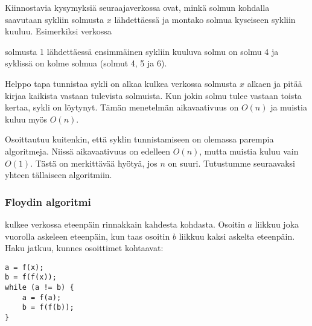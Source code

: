 
Kiinnostavia kysymyksiä seuraajaverkossa ovat,
minkä solmun kohdalla saavutaan sykliin
solmusta $x$ lähdettäessä
ja montako solmua kyseiseen sykliin kuuluu.
Esimerkiksi verkossa

\begin{center}
\end{center}
solmusta 1 lähdettäessä ensimmäinen sykliin kuuluva
solmu on solmu 4 ja syklissä on kolme solmua
(solmut 4, 5 ja 6).

Helppo tapa tunnistaa sykli on alkaa kulkea verkossa
solmusta $x$ alkaen ja pitää kirjaa kaikista vastaan tulevista
solmuista. Kun jokin solmu tulee vastaan toista kertaa,
sykli on löytynyt. Tämän menetelmän aikavaativuus on $O(n)$
ja muistia kuluu myös $O(n)$.

Osoittautuu kuitenkin, että syklin tunnistamiseen on
olemassa parempia algoritmeja.
Niissä aikavaativuus on edelleen $O(n)$,
mutta muistia kuluu vain $O(1)$.
Tästä on merkittävää hyötyä, jos $n$ on suuri.
Tutustumme seuraavaksi yhteen tällaiseen algoritmiin.

\subsubsection{Floydin algoritmi}


 kulkee verkossa eteenpäin rinnakkain
kahdesta kohdasta.
Osoitin $a$ liikkuu joka vuorolla askeleen eteenpäin,
kun taas osoitin $b$ liikkuu kaksi askelta eteenpäin.
Haku jatkuu, kunnes osoittimet kohtaavat:

\begin{lstlisting}
a = f(x);
b = f(f(x));
while (a != b) {
    a = f(a);
    b = f(f(b));
}
\end{lstlisting}

